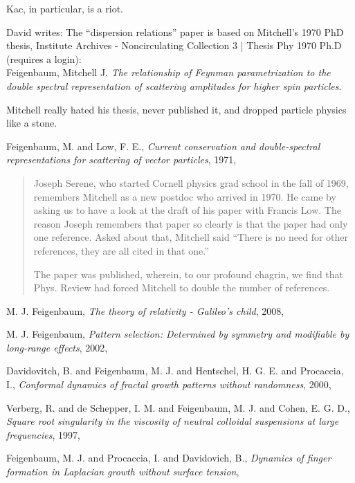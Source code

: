 \begin{description}
Kac, in particular, is a riot.

David writes:
The ``dispersion relations'' paper is
based on Mitchell’s 1970 PhD thesis,
Institute Archives - Noncirculating Collection 3 |
{Thesis Phy 1970 Ph.D}
(requires a login):
\\
Feigenbaum, Mitchell J.
{\em The relationship of Feynman parametrization to the double spectral
representation of scattering amplitudes for higher spin particles}.

Mitchell really hated his thesis, never published it, and dropped
particle physics like a stone.

{Feigenbaum, M. and Low, F. E.},
  {\em Current conservation and double-spectral representations for scattering of vector particles},
{1971},
\begin{quote}
Joseph Serene, who started Cornell physics grad school in the fall of 1969,
remembers Mitchell as a new postdoc who arrived in
1970. He came by asking us to have a look at the draft of his paper with
{Francis Low}.
The reason Joseph remembers that paper so clearly is that the paper had
only one reference. Asked about that, Mitchell said ``There is no need for
other references, they are all cited in that one.''

The paper was published, wherein, to our profound chagrin,
we find that Phys. Review had forced Mitchell to double the number of
references.
\end{quote}

{M. J. Feigenbaum},
{\em The theory of relativity - {Galileo's} child},
{2008},

{M. J. Feigenbaum},
{\em Pattern selection: {Determined} by symmetry and modifiable by long-range effects},
{2002},

{Davidovitch, B. and Feigenbaum, M. J. and Hentschel, H. G. E. and Procaccia, I.},
  {\em Conformal dynamics of fractal growth patterns without randomness},
{2000},

{Verberg, R. and de Schepper, I. M. and Feigenbaum, M. J. and Cohen, E. G. D.},
  {\em Square root singularity in the viscosity of neutral colloidal suspensions at large frequencies},
{1997},

{Feigenbaum, M. J. and Procaccia, I. and Davidovich, B.},
  {\em Dynamics of finger formation in {Laplacian} growth without surface tension},


\end{description}
